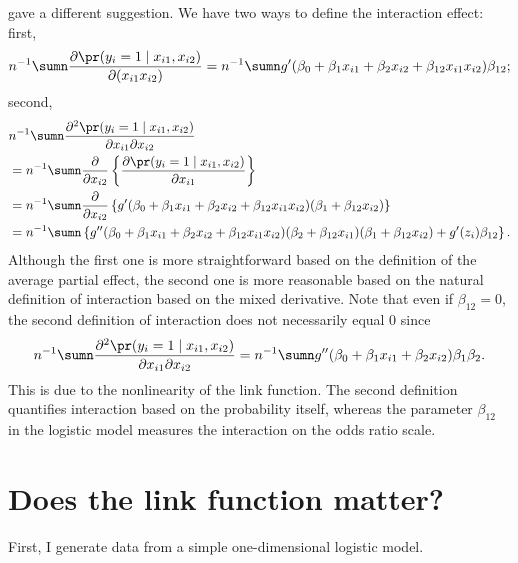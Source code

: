 \citet{ai2003interaction} gave a different suggestion. 
We have two ways to define the interaction effect: first,
\[
n^{-1}\sumn\frac{\partial\pr(y_{i}=1\mid x_{i1},x_{i2})}{\partial(x_{i1}x_{i2})}
=n^{-1}\sumn g'(  \beta_{0}+\beta_{1}x_{i1}+\beta_{2}x_{i2}+\beta_{12}x_{i1}x_{i2} )\beta_{12}; 
\]
second,
\begin{align*}
& n^{-1}\sumn\frac{\partial^{2}\pr(y_{i}=1\mid x_{i1},x_{i2})}{\partial x_{i1}\partial x_{i2}} \\
& =n^{-1}\sumn\frac{\partial}{\partial x_{i2}}\left\{ \frac{\partial\pr(y_{i}=1\mid x_{i1},x_{i2})}{\partial x_{i1}}\right\} \\
 & =n^{-1}\sumn\frac{\partial}{\partial x_{i2}}\left\{ g'(\beta_{0}+\beta_{1}x_{i1}+\beta_{2}x_{i2}+\beta_{12}x_{i1}x_{i2})(\beta_{1}+\beta_{12}x_{i2})\right\} \\
 & =n^{-1}\sumn\left\{ g''( \beta_{0}+\beta_{1}x_{i1}+\beta_{2}x_{i2}+\beta_{12}x_{i1}x_{i2} )(\beta_{2}+\beta_{12}x_{i1})(\beta_{1}+\beta_{12}x_{i2})+g'(z_i)\beta_{12}\right\} .
\end{align*}
Although the first one is more straightforward based on the definition of the average partial effect, the second one is more reasonable based on the natural definition of interaction based on the mixed derivative.  
Note that even if $\beta_{12} = 0$, the second definition of interaction 
does not necessarily equal 0 since
\begin{align*}
 n^{-1}\sumn\frac{\partial^{2}\pr(y_{i}=1\mid x_{i1},x_{i2})}{\partial x_{i1}\partial x_{i2}}  
 =n^{-1}\sumn   g''( \beta_{0}+\beta_{1}x_{i1}+\beta_{2}x_{i2} ) \beta_{1}  \beta_{2} . 
\end{align*}
 This is due to the nonlinearity of the link function. 
The second definition quantifies interaction based on the probability itself, whereas the parameter $\beta_{12}$ in the logistic model measures the interaction on the odds ratio scale. 



\section{Does the link function matter?}\label{chapter::link-matter}

First, I generate data from a simple one-dimensional logistic model.

